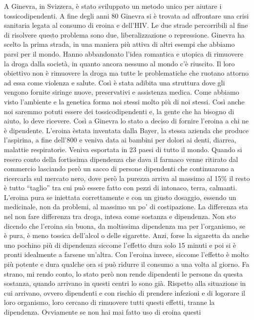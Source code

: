 \documentclass[12pt]{book} %
\begin{document}
\begin{mdframed}[linewidth=1pt]
A Ginevra, in Svizzera, è stato sviluppato un metodo unico per aiutare i tossicodipendenti. A fine degli anni 80 Ginevra
si è trovata ad affrontare una crisi sanitaria legata al consumo di eroina e dell'HIV. Le due
strade percorribili al fine di risolvere questo problema sono due, liberalizzazione o repressione. Ginevra ha scelto la
prima strada, in una maniera più attiva di altri esempi che abbiamo parsi per il mondo. Hanno abbandonato
l'idea romantica e utopica di rimuovere la droga dalla società, in quanto ancora nessuno al mondo
c'è riuscito. Il loro obiettivo non è rimuovere la droga ma tutte le problematiche che ruotano
attorno ad essa come violenza e salute. Così è stata adibita una struttura dove gli vengono fornite siringe nuove,
preservativi e assistenza medica. Come abbiamo visto l'ambiente e la genetica forma noi stessi
molto più di noi stessi. Così anche noi saremmo potuti essere dei tossicodipendenti e, la gente che ha bisogno di
aiuto, lo deve ricevere. Così a Ginevra lo stato a deciso di fornire l'eroina a chi ne è
dipendente. L'eroina èstata inventata dalla Bayer, la stessa azienda che produce
l'aspirina, a fine dell'800 e veniva data ai bambini per dolori ai denti,
diarrea, malattie respiratorie. Veniva esportata in 23 paesi di tutto il mondo. Quando si resero conto della fortissima
dipendenza che dava il farmaco venne ritirato dal commercio lasciando però un sacco di persone dipendenti che
continuarono a ricercarla sul mercato nero, dove però la purezza arriva al massimo al 15\% il resto è tutto “taglio”
tra cui può essere fatto con pezzi di intonaco, terra, calmanti. L'eroina pura se iniettata
correttamente e con un giusto dosaggio, essendo un medicinale, non da problemi, al massimo un po' di costipazione. La
differenza sta nel non fare differenza tra droga, intesa come sostanza e dipendenza. Non sto dicendo che
l'eroina sia buona, da moltissima dipendenza ma per l'organismo, se è pura, è
meno tossica dell'alcol o delle sigarette. Anzi, forse la sigaretta da anche uno pochino più di
dipendenza siccome l'effetto dura solo 15 minuti e poi si è pronti idealmente a farsene
un'altra. Con l'eroina invece, siccome l'effetto è molto
più potente e dura qualche ora si può ridurre il consumo a una volta al giorno. Fa strano, mi rendo conto, lo stato
però non rende dipendenti le persone da questa sostanza, quando arrivano in questi centri lo sono già. Rispetto alla
situazione in cui arrivano, ovvero dipendenti e con rischio di prendere infezioni e di logorare il loro organismo, loro
cercano di rimuovere tutti questi effetti, tranne la dipendenza. Ovviamente se non hai mai fatto uso di eroina questi

\end{mdframed}
\end{document}

